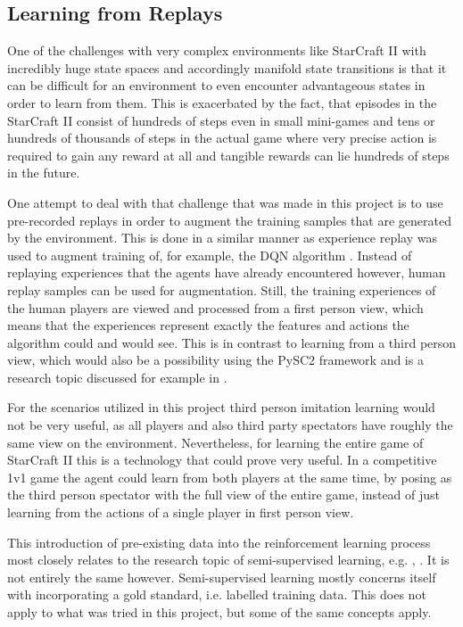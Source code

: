 \subsection{Learning from Replays}
\label{sec:replearn}
One of the challenges with very complex environments like StarCraft II with incredibly huge state spaces and accordingly manifold state transitions is that it can be difficult for an environment to even encounter advantageous states in order to learn from them. This is exacerbated by the fact, that episodes in the StarCraft II consist of hundreds of steps even in small mini-games and tens or hundreds of thousands of steps in the actual game where very precise action is required to gain any reward at all and tangible rewards can lie hundreds of steps in the future. 

One attempt to deal with that challenge that was made in this project is to use pre-recorded replays in order to augment the training samples that are generated by the environment. This is done in a similar manner as experience replay was used to augment training of, for example, the DQN algorithm \citep{DBLP:journals/corr/abs-1712-01275}.
Instead of replaying experiences that the agents have already encountered however, human replay samples can be used for augmentation. Still, the training experiences of the human players are viewed and processed from a first person view, which means that the experiences represent exactly the features and actions the algorithm could and would see. 
This is in contrast to learning from a third person view, which would also be a possibility using the PySC2 framework and is a research topic discussed for example in \citep{DBLP:journals/corr/StadieAS17}. 

For the scenarios utilized in this project third person imitation learning would not be very useful, as all players and also third party spectators have roughly the same view on the environment. Nevertheless, for learning the entire game of StarCraft II this is a technology that could prove very useful. In a competitive 1v1 game the agent could learn from both players at the same time, by posing as the third person spectator with the full view of the entire game, instead of just learning from the actions of a single player in first person view.

This introduction of pre-existing data into the reinforcement learning process most closely relates to the research topic of semi-supervised learning, e.g. \citep{DBLP:journals/corr/FinnYFAL16}, \citep{DBLP:journals/corr/schgan}. It is not entirely the same however. Semi-supervised learning mostly concerns itself with incorporating a gold standard, i.e. labelled training data. This does not apply to what was tried in this project, but some of the same concepts apply.   

